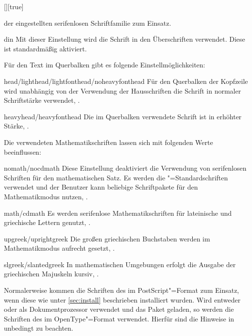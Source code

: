 \begin{Declaration*}{}
\begin{Declaration*}{}
\begin{Declaration*}{}
\begin{Declaration}{[\PSet]}[true]
\begin{values}
  der eingestellten serifenlosen Schriftfamilie zum Einsatz.
\item[din]
  Mit dieser Einstellung wird die Schrift \DIN in den Überschriften verwendet. 
  Diese ist standardmäßig aktiviert.
\end{values}
%
Für den Text im Querbalken gibt es folgende Einstellmöglichkeiten:
%
\begin{values}
\item[head/lighthead/lightfonthead/noheavyfonthead]
  Für den Querbalken der Kopfzeile wird unabhängig von der Verwendung der 
  Hausschriften die Schrift \Univers in normaler Schriftstärke verwendet,
  .
\item[heavyhead/heavyfonthead]
  Die im Querbalken verwendete Schrift ist \Univers in erhöhter Stärke, 
  .
\end{values}
%
Die verwendeten Mathematikschriften lassen sich mit folgenden Werte 
beeinflussen:
%
\begin{values}
\item[nomath/nocdmath]  
  Diese Einstellung deaktiviert die Verwendung von serifenlosen Schriften für 
  den mathematischen Satz. Es werden die "=Standardschriften 
  verwendet und der Benutzer kann beliebige Schriftpakete für den 
  Mathematikmodus nutzen, .
\item[math/cdmath]
  Es werden serifenlose Mathematikschriften für lateinische und griechische 
  Lettern genutzt, .
\item[upgreek/uprightgreek]
  Die großen griechischen Buchstaben werden im Mathematikmodus aufrecht gesetzt,
  .
\item[slgreek/slantedgreek]
  In mathematischen Umgebungen erfolgt die Ausgabe der griechischen Majuskeln 
  kursiv, .
\end{values}
%
Normalerweise kommen die Schriften des \CDs im PostScript"=Format zum Einsatz, 
wenn diese wie unter \autoref{sec:install} beschrieben installiert wurden.
Wird entweder  oder  als Dokumentprozessor 
verwendet und das Paket  geladen, so werden die Schriften des 
\CDs im OpenType"=Format verwendet. Hierfür sind die Hinweise in 
 unbedingt zu beachten.
\end{Declaration}



\end{Declaration*}
\end{Declaration*}
\end{Declaration*}
